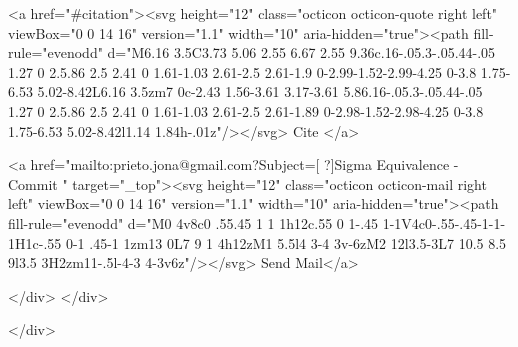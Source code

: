       <a  href="#citation"><svg height="12" class="octicon octicon-quote right left" viewBox="0 0 14 16" version="1.1" width="10" aria-hidden="true"><path fill-rule="evenodd" d="M6.16 3.5C3.73 5.06 2.55 6.67 2.55 9.36c.16-.05.3-.05.44-.05 1.27 0 2.5.86 2.5 2.41 0 1.61-1.03 2.61-2.5 2.61-1.9 0-2.99-1.52-2.99-4.25 0-3.8 1.75-6.53 5.02-8.42L6.16 3.5zm7 0c-2.43 1.56-3.61 3.17-3.61 5.86.16-.05.3-.05.44-.05 1.27 0 2.5.86 2.5 2.41 0 1.61-1.03 2.61-2.5 2.61-1.89 0-2.98-1.52-2.98-4.25 0-3.8 1.75-6.53 5.02-8.42l1.14 1.84h-.01z"/></svg> Cite
      </a>

      <a href="mailto:prieto.jona@gmail.com?Subject=[ ?]Sigma Equivalence - Commit " target="_top"><svg height="12" class="octicon octicon-mail right left" viewBox="0 0 14 16" version="1.1" width="10" aria-hidden="true"><path fill-rule="evenodd" d="M0 4v8c0 .55.45 1 1 1h12c.55 0 1-.45 1-1V4c0-.55-.45-1-1-1H1c-.55 0-1 .45-1 1zm13 0L7 9 1 4h12zM1 5.5l4 3-4 3v-6zM2 12l3.5-3L7 10.5 8.5 9l3.5 3H2zm11-.5l-4-3 4-3v6z"/></svg> Send Mail</a>

    </div>
  </div>

</div>




